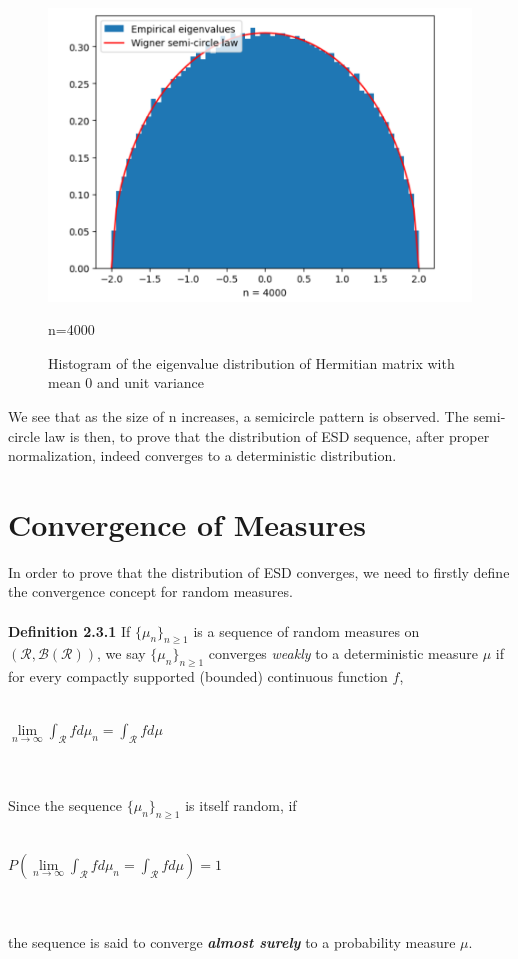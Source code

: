 \documentclass{article}
\begin{document}
\begin{figure}[h]
\begin{minipage}{0.32\linewidth}
		\centerline{\includegraphics[width=\textwidth]{Screenshot 2024-07-20 224026.png}}
		\centerline{n=4000}
	\end{minipage}
 
	\caption{Histogram of the eigenvalue distribution of Hermitian matrix with mean 0 and unit variance}
\end{figure}
 
 We see that as the size of n increases, a semicircle pattern is observed. The semi-circle law is then, to prove that the distribution of ESD sequence, after proper normalization, indeed converges to a deterministic distribution.

 \section{Convergence of Measures}
 In order to prove that the distribution of ESD converges, we need to firstly define the convergence concept for random measures. \\
 \\
\textbf{Definition 2.3.1} If $\{\mu_n\}_{n \geq 1}$ is a sequence of random measures on $(\mathcal{R}, \mathcal{B}(\mathcal{R}))$, we say $\{\mu_n\}_{n \geq 1}$ converges \textit{weakly} to a deterministic measure $\mu$ if for every compactly supported (bounded) continuous function $f$, \\
\\
\centerline{$\lim\limits_{n \rightarrow \infty} \int_{\mathcal{R}}f d\mu_n = \int_{\mathcal{R}}f d\mu$}
\\
\\
Since the sequence $\{\mu_n\}_{n \geq 1}$ is itself random, if\\
\\
\centerline{$P(\lim\limits_{n \rightarrow \infty} \int_{\mathcal{R}}f d\mu_n = \int_{\mathcal{R}}f d\mu) = 1$}
\\
\\
the sequence is said to converge \textit{\textbf{almost surely}} to a probability measure $\mu$.
\end{document}
